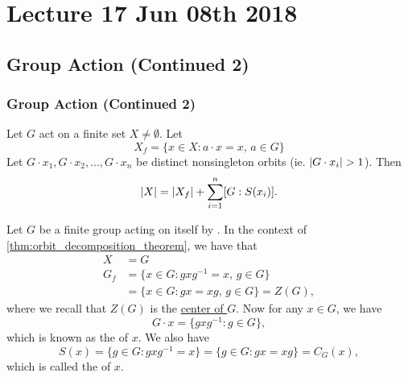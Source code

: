 \chapter{Lecture 17 Jun 08th 2018}%
\label{chp:lecture_17_jun_08th_2018}

\section{Group Action (Continued 2)}%
\label{sec:group_action_continued_2}

\subsection{Group Action (Continued 2)}%
\label{sub:group_action_continued_2}

\begin{note}
  Let $G$ act on a finite set $X \neq \emptyset$. Let
  \begin{equation*}
    X_f = \{x \in X : a \cdot x = x, \, a \in G \}
  \end{equation*}
  Let $G \cdot x_1, G \cdot x_2, ..., G \cdot x_n$ be distinct nonsingleton orbits (ie. $\left|G \cdot x_i\right| > 1$). Then
  \begin{equation*}
    \left|X\right| = \left|X_f\right| + \sum_{i=1}^{n} [ G : S(x_i) ].
  \end{equation*}
\end{note}

\begin{eg}
  Let $G$ be a finite group acting on itself by . In the context of \cref{thm:orbit_decomposition_theorem}, we have that
  \begin{align*}
    X &= G \\
    G_f &= \{x \in G : gxg^{-1} = x, \, g \in G \} \\
        &= \{x \in G : gx = xg, \, g \in G \} = Z(G),
  \end{align*}
  where we recall that $Z(G)$ is the \hyperref[defn:center_of_a_group]{center of $G$}. Now for any $x \in G$, we have
  \begin{equation*}
    G \cdot x = \{ gxg^{-1} : g \in G \},
  \end{equation*}
  which is known as the  of $x$. We also have
  \begin{equation*}
    S(x) = \{g \in G : gxg^{-1} = x \} = \{g \in G : gx = xg \} = C_G(x),
  \end{equation*}
  which is called the  of $x$.
\end{eg}

